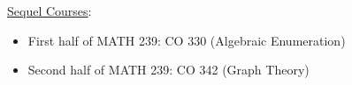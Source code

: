 \underline{Sequel Courses}:
\begin{itemize}
    \item First half of MATH 239: CO 330 (Algebraic Enumeration)
    \item Second half of MATH 239: CO 342 (Graph Theory)
\end{itemize}
